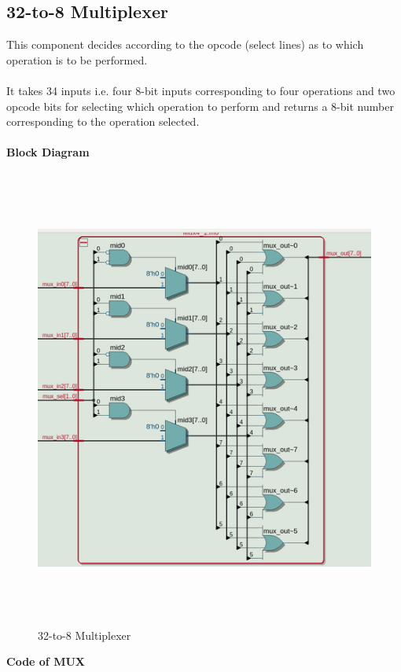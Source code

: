 \documentclass[12pt]{article}
\begin{document}
    \newpage
    \subsection{32-to-8 Multiplexer}
        This component decides according to the opcode (select lines) as to which operation is to be performed.\\\\
        It takes 34 inputs i.e. four 8-bit inputs corresponding to four operations and two opcode bits for selecting which operation to perform and returns a 8-bit number corresponding to the operation selected.\\\\
        \noindent
        \textbf{Block Diagram}
        \begin{figure}[H]
            \centering
            \includegraphics[width=0.8\linewidth, height=6in]{mux.png}
            \caption{32-to-8 Multiplexer}
            \label{fig:instru}
        \end{figure} 
        \newpage
        \noindent
        \textbf{Code of MUX}
        \noindent
\end{document}
